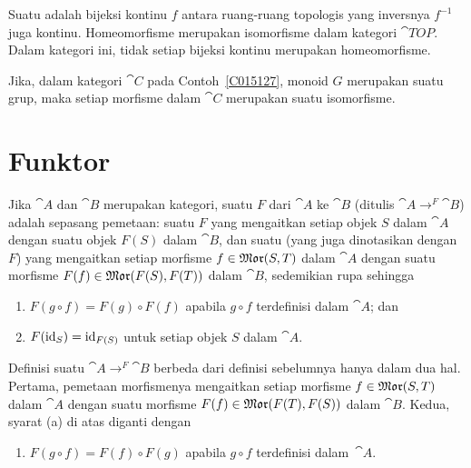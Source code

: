 \begin{exam} Suatu
 adalah bijeksi kontinu $f$ antara ruang-ruang topologis yang inversnya $f^{-1}$ juga kontinu. Homeomorfisme
merupakan isomorfisme dalam kategori $\cat{TOP}$. Dalam kategori ini, tidak setiap bijeksi kontinu merupakan homeomorfisme.
\end{exam}

\begin{exam} Jika, dalam kategori $\cat C$ pada Contoh~\ref{C015127}, monoid $G$ merupakan suatu grup,
maka setiap morfisme dalam $\cat C$ merupakan suatu isomorfisme.
\end{exam}






\section{Funktor}
\begin{defn} Jika $\cat{A}$ dan $\cat{B}$ merupakan kategori, suatu
 $F$ dari $\cat A$ ke $\cat B$ (ditulis ${\cat A}\to^F{\cat B}$) adalah
sepasang pemetaan: suatu
 $F$ yang mengaitkan setiap objek $S$ dalam $\cat A$ dengan suatu objek $F(S)$ dalam
$\cat B$, dan suatu
 (yang juga dinotasikan dengan $F$) yang mengaitkan setiap morfisme $f \in \operatorname{\mathfrak{Mor}}(S,T)$ dalam $\cat A$ dengan suatu morfisme $F(f) \in \operatorname{\mathfrak{Mor}}(F(S),F(T))$ dalam $\cat B$, sedemikian rupa sehingga
 \begin{enumerate}
  \item $F(g \circ f) = F(g) \circ F(f)$ apabila $g \circ f$ terdefinisi dalam $\cat A$; dan
  \item $F(\operatorname{id}_{S}) = \operatorname{id}_{F(S)}$ untuk setiap objek $S$ dalam $\cat A$.
 \end{enumerate}

Definisi suatu
 ${\cat A}\to^F{\cat B}$ berbeda dari definisi sebelumnya
hanya dalam dua hal. Pertama, pemetaan morfismenya mengaitkan setiap morfisme $f \in \operatorname{\mathfrak{Mor}}(S,T)$ dalam
$\cat A$ dengan suatu morfisme $F(f) \in \operatorname{\mathfrak{Mor}}(F(T),F(S))$ dalam $\cat B$. Kedua, syarat (a)
di atas diganti dengan
 \begin{enumerate}
  \item[(\rm{a'})] $F(g \circ f) = F(f) \circ F(g)$ apabila $g \circ f$
terdefinisi dalam~$\cat A$.
 \end{enumerate}
\end{defn}


